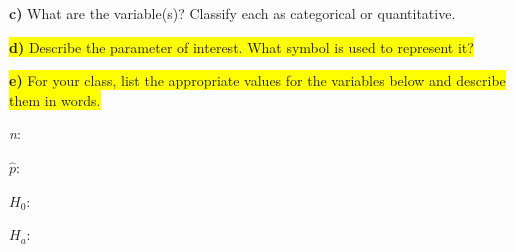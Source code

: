 \documentclass{article}
\newif\ifPrintSolution
\newcommand{\sol}[1]{\ifPrintSolution {\color{blue} #1 } \fi}
\begin{document}
\hspace{0.1in} \textbf{c) } What are the variable(s)? Classify each as categorical or quantitative.

\sol{The variable is which cookie was chosen as the tastiest, and it is categorical (with three levels).}

\vspace{0.25in}

\hspace{0.1in}\colorbox{yellow}{ \textbf{d) } Describe the parameter of interest. What symbol is used to represent it?}

\sol{The parameter of interest is the proportion of people who choose MAJ McD's cookies over the competitors, represented by $\pi$}

\vspace{0.2in}

\hspace{0.1in} \colorbox{yellow}{\textbf{e) } For your class, list the appropriate values for the variables below and describe them in words.}

\vspace{0.1in} \hspace{0.2in}  \textit{n}: \sol{Will vary by class, generally 18;\\
The number of observations in the sample, aka the number of individuals given cookies and asked to choose one to eat. Here, class size.}

\vspace{0.1in} \hspace{0.2in} $\hat{p}$: \sol{Will vary based on class; The observed proportion of students in the class who choose MAJ McD's cookies as their favorite to eat. $\frac{Count \; who \; chose \; MAJ \; McD's}{Total \; cadets}$}

\vspace{0.1in} \hspace{0.2in} $H_0$: \sol{$\pi = \frac{1}{3}$. The null hypothesis. The true long run proportion of those who prefer MAJ McD's cookie is equal to  1/3  (the class will choose MAJ McD's cookie randomly.)}

\vspace{0.1in} \hspace{0.2in} $H_a$: \sol{$\pi > \frac{1}{3}$. The alternate hypothesis, the true long run proportion of cadets who will choose MAJ McD's cookie is greater than $\frac{1}{3}$}

\vspace{0.25in}
\end{document}

